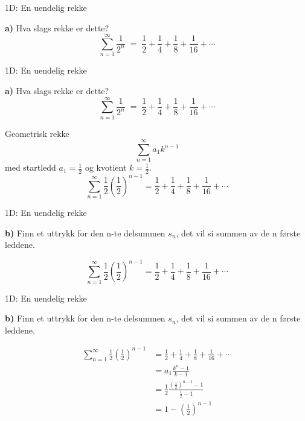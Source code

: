 \cyanheader
\begin{frame}[fragile]{1D: En uendelig rekke}

\medskip
\textbf{a)} Hva slags rekke er dette? \\
\[
\sum_{n=1}^{\infty} \frac{1}{2^{n}} \;=\; \frac{1}{2}+\frac{1}{4}+\frac{1}{8}+\frac{1}{16}+\cdots
\]
\end{frame}

\cyanheader
\begin{frame}[fragile]{1D: En uendelig rekke}


\textbf{a)} Hva slags rekke er dette? \\
\[
\sum_{n=1}^{\infty} \frac{1}{2^{n}} \;=\; \frac{1}{2}+\frac{1}{4}+\frac{1}{8}+\frac{1}{16}+\cdots
\]

\medskip
Geometrisk rekke 
\[
\sum_{n=1}^{\infty} a_1 k^{n-1}
\]
med startledd $a_1=\tfrac12$ og kvotient $k=\tfrac12$.
\[\sum_{n=1}^{\infty} \frac{1}{2}\left(\frac{1}{2}\right)^{n-1}=\frac{1}{2}+\frac{1}{4}+\frac{1}{8}+\frac{1}{16}+\cdots\]
\end{frame}

\cyanheader
\begin{frame}[fragile]{1D: En uendelig rekke}


\textbf{b)} Finn et uttrykk for den n-te delsummen $s_n$, det vil si summen av de n første leddene. \\
\medskip

\[\sum_{n=1}^{\infty} \frac{1}{2}\left(\frac{1}{2}\right)^{n-1}=\frac{1}{2}+\frac{1}{4}+\frac{1}{8}+\frac{1}{16}+\cdots\]
\end{frame}

\cyanheader
\begin{frame}[fragile]{1D: En uendelig rekke}

\textbf{b)} Finn et uttrykk for den n-te delsummen $s_n$, det vil si summen av de n første leddene. 

\medskip
\begin{align*}
\sum_{n=1}^{\infty} \frac{1}{2}\left(\frac{1}{2}\right)^{n-1}&=\frac{1}{2}+\frac{1}{4}+\frac{1}{8}+\frac{1}{16}+\cdots\\
&=a_1\frac{k^n-1}{k-1}\\
&=\frac{1}{2}\frac{\left(\frac{1}{2}\right)^{n-1}-1}{\frac{1}{2}-1}\\
&=1-\left(\frac{1}{2}\right)^{n-1}
\end{align*}
\end{frame}


